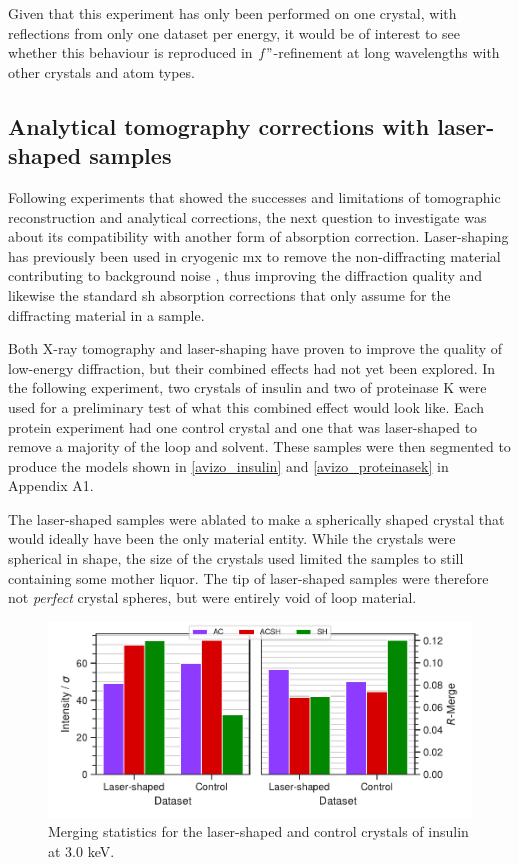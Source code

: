 Given that this experiment has only been performed on one crystal, with reflections from only one dataset per energy, it would be of interest to see whether this behaviour is reproduced in $f"$-refinement at long wavelengths with other crystals and atom types. %

\subsection{Analytical tomography corrections with laser-shaped samples}

Following experiments that showed the successes and limitations of tomographic reconstruction and analytical corrections, the next question to investigate was about its compatibility with another form of absorption correction. Laser-shaping has previously been used in cryogenic \ac{mx} to remove the non-diffracting material contributing to background noise \cite{Basu2019}, thus improving the diffraction quality and likewise the standard \ac{sh} absorption corrections that only assume for the diffracting material in a sample.

Both X-ray tomography and laser-shaping have proven to improve the quality of low-energy diffraction, but their combined effects had not yet been explored. In the following experiment, two crystals of insulin and two of proteinase K were used for a preliminary test of what this combined effect would look like. Each protein experiment had one control crystal and one that was laser-shaped to remove a majority of the loop and solvent. These samples were then segmented to produce the models shown in \cref{avizo_insulin} and \cref{avizo_proteinasek} in Appendix A1.

The laser-shaped samples were ablated to make a spherically shaped crystal that would ideally have been the only material entity. While the crystals were spherical in shape, the size of the crystals used limited the samples to still containing some mother liquor. The tip of laser-shaped samples were therefore not \textit{perfect} crystal spheres, but were entirely void of loop material.


\begin{figure}[h]
    \centering
    \includegraphics{plots/exp2/ins_stats.pdf}
    \caption{Merging statistics for the laser-shaped and control crystals of insulin at 3.0 \unit{keV}.}
    \label{fig:insulin}
\end{figure}

